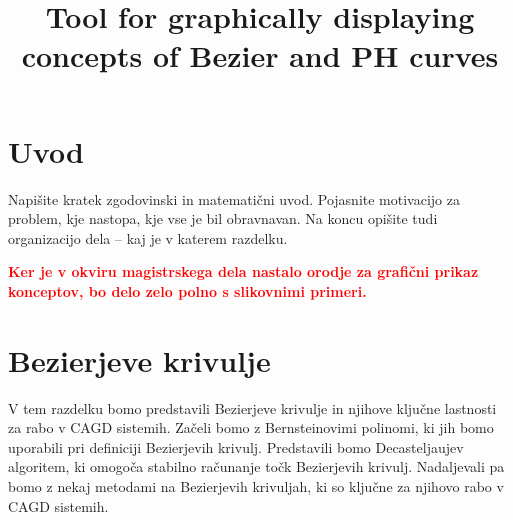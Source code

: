 \documentclass[isrm2, tisk]{fmfdelo}
\title{Tool for graphically displaying concepts of Bezier and PH curves}
\newcommand{\mycomment}[1]{\textbf{\textcolor{red}{#1}}}
\begin{document}
    \section{Uvod}
    Napišite kratek zgodovinski in matematični uvod. Pojasnite motivacijo za problem, kje
    nastopa, kje vse je bil obravnavan. Na koncu opišite tudi organizacijo dela -- kaj je v
    katerem razdelku.


    \mycomment{Ker je v okviru magistrskega dela nastalo orodje za grafični prikaz konceptov, bo delo zelo polno s slikovnimi primeri.}


    \section{Bezierjeve krivulje}\label{sec:bezierjeve-krivulje}
    V tem razdelku bomo predstavili Bezierjeve krivulje in njihove ključne lastnosti za rabo v CAGD sistemih.
    Začeli bomo z Bernsteinovimi polinomi, ki jih bomo uporabili pri definiciji Bezierjevih krivulj.
    Predstavili bomo Decasteljaujev algoritem, ki omogoča stabilno računanje točk Bezierjevih krivulj.
    Nadaljevali pa bomo z nekaj metodami na Bezierjevih krivuljah, ki so ključne za njihovo rabo v CAGD sistemih.
\end{document}
